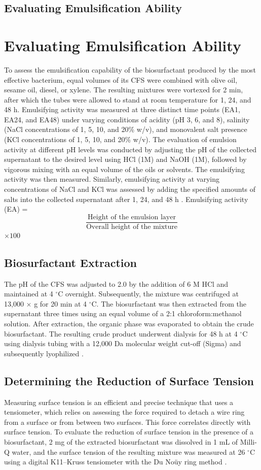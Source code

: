 \documentclass{svjour3}
\begin{document}
\subsection{Evaluating Emulsification Ability}

\section{Evaluating Emulsification Ability}
To assess the emulsification capability of the biosurfactant produced by the most effective bacterium, equal volumes of its CFS were combined with olive oil, sesame oil, diesel, or xylene. The resulting mixtures were vortexed for 2 min, after which the tubes were allowed to stand at room temperature for 1, 24, and 48 h. Emulsifying activity was measured at three distinct time points (EA1, EA24, and EA48) under varying conditions of acidity (pH 3, 6, and 8), salinity (NaCl concentrations of 1, 5, 10, and 20\% w/v), and monovalent salt presence (KCl concentrations of 1, 5, 10, and 20\% w/v). The evaluation of emulsion activity at different pH levels was conducted by adjusting the pH of the collected supernatant to the desired level using HCl (1M) and NaOH (1M), followed by vigorous mixing with an equal volume of the oils or solvents. The emulsifying activity was then measured. Similarly, emulsifying activity at varying concentrations of NaCl and KCl was assessed by adding the specified amounts of salts into the collected supernatant after 1, 24, and 48 h \cite{27}.
Emulsifying activity (EA) =
\[
\frac{\text{Height of the emulsion layer}}{\text{Overall height of the mixture}}
\]
$\times 100$
\subsection{Biosurfactant Extraction}
The pH of the CFS was adjusted to 2.0 by the addition of 6 M HCl and maintained at 4 $^\circ$C overnight. Subsequently, the mixture was centrifuged at 13,000 $\times$ g for 20 min at 4 $^\circ$C. The biosurfactant was then extracted from the supernatant three times using an equal volume of a 2:1 chloroform:methanol solution. After extraction, the organic phase was evaporated to obtain the crude biosurfactant. The resulting crude product underwent dialysis for 48 h at 4 $^\circ$C using dialysis tubing with a 12,000 Da molecular weight cut-off (Sigma) and subsequently lyophilized \cite{28}.
\subsection{Determining the Reduction of Surface Tension}
Measuring surface tension is an efficient and precise technique that uses a tensiometer, which relies on assessing the force required to detach a wire ring from a surface or from between two surfaces. This force correlates directly with surface tension. To evaluate the reduction of surface tension in the presence of a biosurfactant, 2 mg of the extracted biosurfactant was dissolved in 1 mL of Milli-Q water, and the surface tension of the resulting mixture was measured at 26 $^\circ$C using a digital K11–Kruss tensiometer with the Du Noüy ring method \cite{29, 30}.
\end{document}
